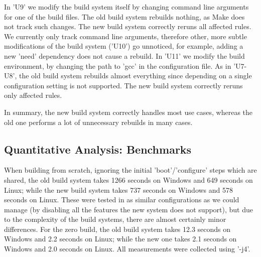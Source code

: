 In \lst'U9' we modify the build system itself by changing command line
arguments for one of the build files. The old build system rebuilds nothing,
as Make does not track such changes. The new build system correctly reruns all
affected rules. We currently only track command line arguments, therefore other,
more subtle modifications of the build system (\lst'U10') go unnoticed, for
example, adding a new \lst'need' dependency does not cause a rebuild.
In \lst'U11' we modify the build environment, by changing the path to \lst'gcc'
in the configuration file. As in \lst'U7-U8', the old build system rebuilds
almost everything since depending on a single configuration setting is not
supported. The new build system correctly reruns only affected rules.

%
%

In summary, the new build system correctly handles most use cases, whereas
the old one performs a lot of unnecessary rebuilds in many cases.

\vspace{-1mm}
\subsection{Quantitative Analysis: Benchmarks\label{sec:benchmarks}}

When building from scratch, ignoring the initial \lst'boot'/\lst'configure'
steps which are shared, the old build system takes 1266 seconds on Windows and
649 seconds on Linux; while the new build system takes 737 seconds on Windows and
578 seconds on Linux. These were tested in as similar configurations as we could
manage (by disabling all the features the new system does not support),
but due to the complexity of the build systems, there are almost certainly
minor differences. For the zero build, the old build system takes 12.3
seconds on Windows and 2.2 seconds on Linux; while the new one takes
2.1 seconds on Windows and 2.0 seconds on Linux. All measurements were collected
using \lst'-j4'.

